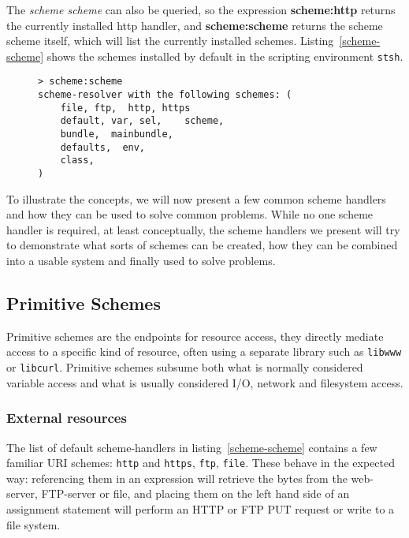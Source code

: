 \documentclass[preprint,authoryear]{llncs}
\begin{document}
The \emph{scheme scheme} can also be queried,
so the expression {\bf scheme:http} returns the currently installed http handler, and 
{\bf scheme:scheme} returns the scheme scheme itself, which will list the currently
installed schemes.  Listing~\ref{scheme-scheme} shows the schemes installed by
default in the scripting environment {\tt stsh}.

\begin{figure}[htbp]
\begin{lstlisting}[style=L,label=scheme-scheme,caption=List of schemes via scheme:scheme.]
> scheme:scheme 
scheme-resolver with the following schemes: (
    file, ftp,  http, https
    default, var, sel,    scheme,
    bundle,  mainbundle,
    defaults,  env,
    class,
)
\end{lstlisting}
\end{figure}

To illustrate the concepts, we will now present a few common scheme handlers and how they can be
used to solve common problems.  While no one scheme handler is required, at least conceptually,
the scheme handlers we present will try to demonstrate what sorts of schemes can be created,
how they can be combined into a usable system and finally used to solve problems.

\subsection{Primitive Schemes}
\label{primitiveSchemes}

Primitive schemes are the endpoints for resource access, they directly
mediate access to a specific kind of resource, often using a separate
library such as {\tt libwww} or {\tt libcurl}.  Primitive schemes
subsume both what is normally considered variable access and 
what is usually considered I/O, network and filesystem access.


\subsubsection{External resources}
\label{externalResources}

The list of default scheme-handlers in listing~\ref{scheme-scheme} contains a few familiar URI schemes:
{\tt http} and {\tt https}, {\tt ftp}, {\tt file}.   These behave in the expected way:   referencing them in an expression will
retrieve the bytes from the web-server, FTP-server or file, and placing them on the left hand side of
an assignment statement will perform an HTTP or FTP PUT request or write to a file system. 
 
\end{document}
